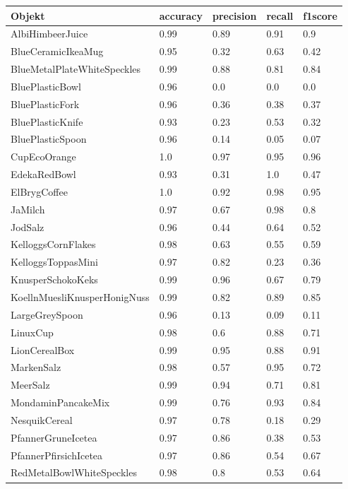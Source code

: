 \begin{table}
\centering
\small
{}
\begin{tabularx}{\textwidth}{Xllll}
\textbf{Objekt}	& \textbf{\gls{accuracy}} & \textbf{\gls{precision}}	& \textbf{\gls{recall}}	& \textbf{\gls{f1score}} \\ \hline
AlbiHimbeerJuice & 0.99 & 0.89 & 0.91 & 0.9 \\  
BlueCeramicIkeaMug & 0.95 & 0.32 & 0.63 & 0.42 \\  
BlueMetalPlateWhiteSpeckles & 0.99 & 0.88 & 0.81 & 0.84 \\  
BluePlasticBowl & 0.96 & 0.0 & 0.0 & 0.0 \\  
BluePlasticFork & 0.96 & 0.36 & 0.38 & 0.37 \\  
BluePlasticKnife & 0.93 & 0.23 & 0.53 & 0.32 \\  
BluePlasticSpoon & 0.96 & 0.14 & 0.05 & 0.07 \\  
CupEcoOrange & 1.0 & 0.97 & 0.95 & 0.96 \\  
EdekaRedBowl & 0.93 & 0.31 & 1.0 & 0.47 \\  
ElBrygCoffee & 1.0 & 0.92 & 0.98 & 0.95 \\  
JaMilch & 0.97 & 0.67 & 0.98 & 0.8 \\  
JodSalz & 0.96 & 0.44 & 0.64 & 0.52 \\  
KelloggsCornFlakes & 0.98 & 0.63 & 0.55 & 0.59 \\  
KelloggsToppasMini & 0.97 & 0.82 & 0.23 & 0.36 \\  
KnusperSchokoKeks & 0.99 & 0.96 & 0.67 & 0.79 \\  
KoellnMuesliKnusperHonigNuss & 0.99 & 0.82 & 0.89 & 0.85 \\  
LargeGreySpoon & 0.96 & 0.13 & 0.09 & 0.11 \\  
LinuxCup & 0.98 & 0.6 & 0.88 & 0.71 \\  
LionCerealBox & 0.99 & 0.95 & 0.88 & 0.91 \\  
MarkenSalz & 0.98 & 0.57 & 0.95 & 0.72 \\  
MeerSalz & 0.99 & 0.94 & 0.71 & 0.81 \\  
MondaminPancakeMix & 0.99 & 0.76 & 0.93 & 0.84 \\  
NesquikCereal & 0.97 & 0.78 & 0.18 & 0.29 \\  
PfannerGruneIcetea & 0.97 & 0.86 & 0.38 & 0.53 \\  
PfannerPfirsichIcetea & 0.97 & 0.86 & 0.54 & 0.67 \\  
RedMetalBowlWhiteSpeckles & 0.98 & 0.8 & 0.53 & 0.64 \\  

\end{tabularx}
\end{table}
